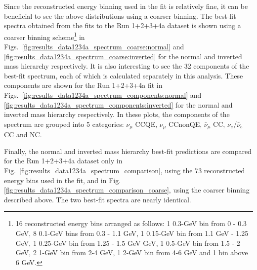 Since the reconstructed energy binning used in the fit is relatively fine, it can be beneficial to see the above distributions using 
a coarser binning. The best-fit spectra obtained from the fits to the Run 1+2+3+4a %
dataset is 
shown using a coarser binning scheme\footnote{
  16 reconstructed energy bins arranged as follows:
  1 0.3-GeV bin from 0 - 0.3 GeV,
  8 0.1-GeV bins from 0.3 - 1.1 GeV,
  1 0.15-GeV bin from 1.1 GeV - 1.25 GeV,
  1 0.25-GeV bin from 1.25 - 1.5 GeV GeV,
  1 0.5-GeV bin from 1.5 - 2 GeV,
  2 1-GeV bin from 2-4 GeV,
  1 2-GeV bin from 4-6 GeV and
  1 bin above 6 GeV.
} 
in Figs.\
\ref{fig:results_data1234a_spectrum_coarse:normal} and \ref{fig:results_data1234a_spectrum_coarse:inverted}
for the normal and inverted mass hierarchy respectively.
It is also interesting to see the 32 components of the best-fit spectrum, each of which is calculated separately 
in this analysis. These components are shown for the Run 1+2+3+4a fit in 
Figs.\  \ref{fig:results_data1234a_spectrum_components:normal} and \ref{fig:results_data1234a_spectrum_components:inverted}
for the normal and inverted mass hierarchy respectively.
In these plots, the components of the spectrum are grouped into 5 categories: 
$\nu_{\mu}$ CCQE, $\nu_{\mu}$ CCnonQE, $\bar{\nu}_{\mu}$ CC, $\nu_{e}$/$\bar{\nu}_{e}$ CC and NC.

\label{fig:results_data1234a_spectrum_comparison_coarse}
Finally, the normal and inverted mass hierarchy best-fit predictions are compared for the Run 1+2+3+4a dataset only in
Fig.\ \ref{fig:results_data1234a_spectrum_comparison},
using the 73 reconstructed energy bins used in the fit, and in
Fig. \ref{fig:results_data1234a_spectrum_comparison_coarse},
using the coarser binning described above.
The two best-fit spectra are nearly identical.


